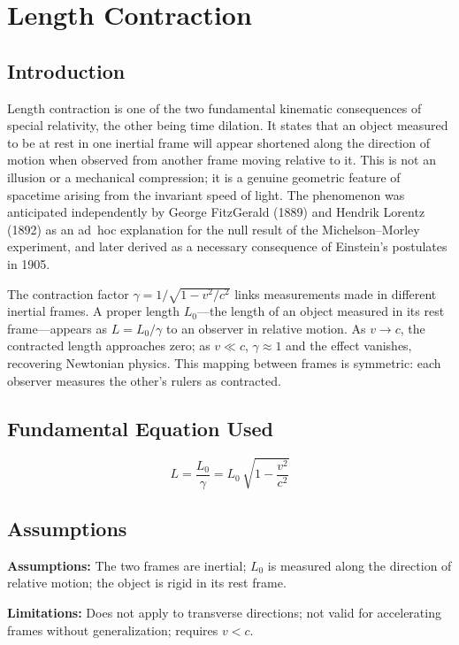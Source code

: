 \chapter{Length Contraction}

\section*{Introduction}

Length contraction is one of the two fundamental kinematic consequences of special relativity, the other being time dilation. It states that an object measured to be at rest in one inertial frame will appear shortened along the direction of motion when observed from another frame moving relative to it. This is not an illusion or a mechanical compression; it is a genuine geometric feature of spacetime arising from the invariant speed of light. The phenomenon was anticipated independently by George FitzGerald (1889) and Hendrik Lorentz (1892) as an ad~hoc explanation for the null result of the Michelson--Morley experiment, and later derived as a necessary consequence of Einstein's postulates in 1905.

The contraction factor $\gamma = 1/\sqrt{1 - v^{2}/c^{2}}$ links measurements made in different inertial frames. A proper length $L_{0}$—the length of an object measured in its rest frame—appears as $L = L_{0}/\gamma$ to an observer in relative motion. As $v \to c$, the contracted length approaches zero; as $v \ll c$, $\gamma \approx 1$ and the effect vanishes, recovering Newtonian physics. This mapping between frames is symmetric: each observer measures the other's rulers as contracted.
\section*{Fundamental Equation Used}

\begin{equation}
\boxed{\; L = \frac{L_{0}}{\gamma} = L_{0}\,\sqrt{1 - \frac{v^{2}}{c^{2}}}\;}
\label{eq:length-contraction}
\end{equation}
\section*{Assumptions}

\textbf{Assumptions:} The two frames are inertial; $L_{0}$ is measured along the direction of relative motion; the object is rigid in its rest frame.


\textbf{Limitations:} Does not apply to transverse directions; not valid for accelerating frames without generalization; requires $v < c$.


